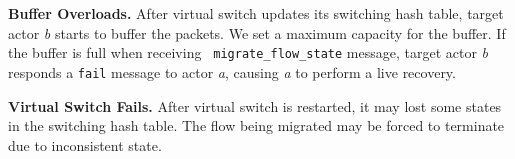 \textbf{Buffer Overloads.} After virtual switch updates its switching hash
table, target actor \textit{b} starts to buffer the packets. We set a maximum
capacity for the buffer. If the buffer is full when receiving {\tt
migrate\_flow\_state} message, target actor \textit{b} responds a {\tt fail}
message to actor \textit{a}, causing \textit{a} to perform a live recovery.

\textbf{Virtual Switch Fails.} After virtual switch is restarted, it may lost
some states in the switching hash table. The flow being migrated may be forced
to terminate due to inconsistent state.









